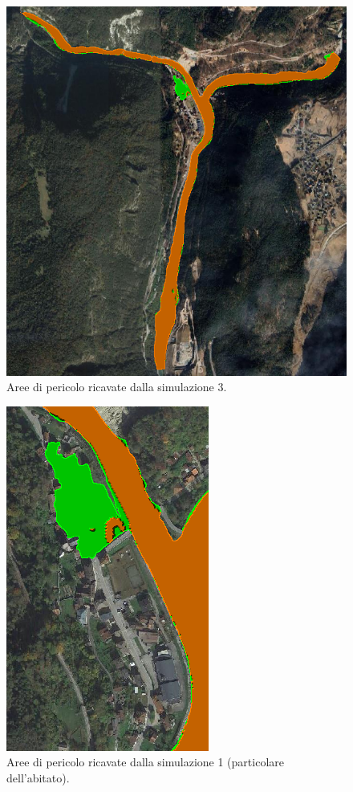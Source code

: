 \begin{figure}[H] \centering
    \includegraphics[scale=0.5]{immagini/aree_pericolo_3.png}
    \caption{Aree di pericolo ricavate dalla simulazione 3.}
    \label{figure:aree_pericolo_3}
\end{figure}

\begin{figure}[H] \centering
    \includegraphics[scale=0.5]{immagini/part_aree_pericolo_1.png}
    \caption{Aree di pericolo ricavate dalla simulazione 1 (particolare dell'abitato).}
    \label{figure:part_aree_pericolo_1}
\end{figure}

